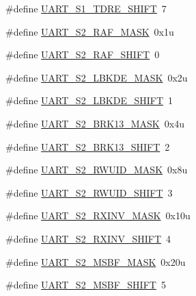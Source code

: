 \begin{DoxyCompactItemize}
\item 
\#define \hyperlink{group___u_a_r_t___register___masks_ga5c58dab9e10b6e9c41ecf6999b56ea0c}{U\+A\+R\+T\+\_\+\+S1\+\_\+\+T\+D\+R\+E\+\_\+\+S\+H\+I\+FT}~7
\item 
\#define \hyperlink{group___u_a_r_t___register___masks_gaa16c5c48ff5ecf080e485880145828c0}{U\+A\+R\+T\+\_\+\+S2\+\_\+\+R\+A\+F\+\_\+\+M\+A\+SK}~0x1u
\item 
\#define \hyperlink{group___u_a_r_t___register___masks_ga0eb8d9ed83a7cb0ed2edc0d3906ac5f1}{U\+A\+R\+T\+\_\+\+S2\+\_\+\+R\+A\+F\+\_\+\+S\+H\+I\+FT}~0
\item 
\#define \hyperlink{group___u_a_r_t___register___masks_ga537e0b2cc3f4eb0056498ff63641bc3b}{U\+A\+R\+T\+\_\+\+S2\+\_\+\+L\+B\+K\+D\+E\+\_\+\+M\+A\+SK}~0x2u
\item 
\#define \hyperlink{group___u_a_r_t___register___masks_ga192cec151a02a4a29e46b3c061127434}{U\+A\+R\+T\+\_\+\+S2\+\_\+\+L\+B\+K\+D\+E\+\_\+\+S\+H\+I\+FT}~1
\item 
\#define \hyperlink{group___u_a_r_t___register___masks_gab2b333a78ce968eece87bcecd87a8673}{U\+A\+R\+T\+\_\+\+S2\+\_\+\+B\+R\+K13\+\_\+\+M\+A\+SK}~0x4u
\item 
\#define \hyperlink{group___u_a_r_t___register___masks_ga6b19eb1eefbef73859cc6eec77d863e4}{U\+A\+R\+T\+\_\+\+S2\+\_\+\+B\+R\+K13\+\_\+\+S\+H\+I\+FT}~2
\item 
\#define \hyperlink{group___u_a_r_t___register___masks_gac04113c9c307f88a4e51db472d274eee}{U\+A\+R\+T\+\_\+\+S2\+\_\+\+R\+W\+U\+I\+D\+\_\+\+M\+A\+SK}~0x8u
\item 
\#define \hyperlink{group___u_a_r_t___register___masks_ga9a972894e69ee588eab48c8436be9fde}{U\+A\+R\+T\+\_\+\+S2\+\_\+\+R\+W\+U\+I\+D\+\_\+\+S\+H\+I\+FT}~3
\item 
\#define \hyperlink{group___u_a_r_t___register___masks_ga80b6af8d528290157cd93b8e33402e9e}{U\+A\+R\+T\+\_\+\+S2\+\_\+\+R\+X\+I\+N\+V\+\_\+\+M\+A\+SK}~0x10u
\item 
\#define \hyperlink{group___u_a_r_t___register___masks_ga9e9f9f846534bbefdb7c7b88a66d29fc}{U\+A\+R\+T\+\_\+\+S2\+\_\+\+R\+X\+I\+N\+V\+\_\+\+S\+H\+I\+FT}~4
\item 
\#define \hyperlink{group___u_a_r_t___register___masks_ga864a0b6ff26ed84f04d0b2f36a30468a}{U\+A\+R\+T\+\_\+\+S2\+\_\+\+M\+S\+B\+F\+\_\+\+M\+A\+SK}~0x20u
\item 
\#define \hyperlink{group___u_a_r_t___register___masks_gaf1e853675fb82a43501d259573de5eca}{U\+A\+R\+T\+\_\+\+S2\+\_\+\+M\+S\+B\+F\+\_\+\+S\+H\+I\+FT}~5
\item 

\end{DoxyCompactItemize}
